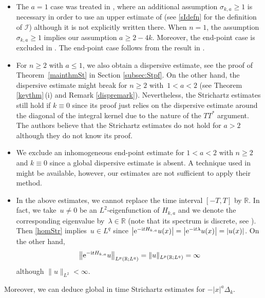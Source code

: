 \documentclass[10pt,a4paper]{amsart}
\numberwithin{equation}{section}
\def\R{\mathbb{R}}%
\def\l{\lambda}
\def\s{\sigma}
\newcommand{\sI}{\mathscr{I}}
\begin{document}
\begin{Remark}\label{rem:mainthmrem}\quad
\begin{itemize}\itemsep=0pt
\item[(1)]
The $a=1$ case was treated in \cite{B}, where an additional assumption $\s_{k,a}\ge 1$ is necessary in order to use an upper estimate of \smash{$\sI\bigl(2,\frac{\s_{k,a}-1}{2};w;t\bigr)$} \cite[Proposition 4.26]{BKO} (see \eqref{sIdefn} for the definition of $\sI$) although it is not explicitly written there. When $n=1$, the assumption~${\s_{k,a}\ge 1}$ implies our assumption $a\ge 2-4k$. Moreover, the end-point case \smash{$\bigl(2,\frac{2\s_{k,a}}{\s_{k,a}-1}\bigr)$} is excluded in \cite{B}.
The end-point case follows from the result in \cite{KT}.

\item[(2)] For $n\geq 2$ with $a\leq 1$, we also obtain a dispersive estimate, see the proof of Theorem~\ref{mainthmSt} in Section \ref{subsec:Stpf}. On the other hand, the dispersive estimate might break for $n\geq 2$ with~${1<a<2}$ (see Theorem \ref{keythm}\,(i) and Remark \ref{dispremark}). Nevertheless, the Strichartz estimates still hold if $k\equiv 0$ since its proof just relies on the dispersive estimate around the diagonal of the integral kernel due to the nature of the $TT^*$ argument. The authors believe that the Strichartz estimates do not hold for $a>2$ although they do not know its proof.


\item[(3)] We exclude an inhomogeneous end-point estimate for $1<a<2$ with $n\geq 2$ and $k\equiv 0$ since a global dispersive estimate is absent. A technique used in \cite{HZ,ZZ} might be available, however, our estimates are not sufficient to apply their method.

\item[(4)] In the above estimates, we cannot replace the time interval $[-T,T]$ by $\R$. In fact, we take~${u\neq 0}$ be an $L^2$-eigenfunction of $H_{k,a}$ and we denote the corresponding eigenvalue by~${\l\in \R}$ (note that its spectrum is discrete, see \cite[Corollary 3.22]{BKO}). Then \eqref{homStr} implies~${u\in L^q}$ since $\big|{\rm e}^{-{\rm i}tH_{k,a}}u(x)\big|=\big|{\rm e}^{-{\rm i}t\l}u(x)\big|=|u(x)|$. On the other hand,
 \[
 \big\|{\rm e}^{-{\rm i}tH_{k,a}}u\big\|_{L^{p}(\R;L^q)}=\|u\|_{L^{p}(\R;L^q)}=\infty\] although $\|u\|_{L^2}<\infty$.
\end{itemize}
\end{Remark}

Moreover, we can deduce global in time Strichartz estimates for $-|x|^a\Delta_{k}$.
\end{document}
